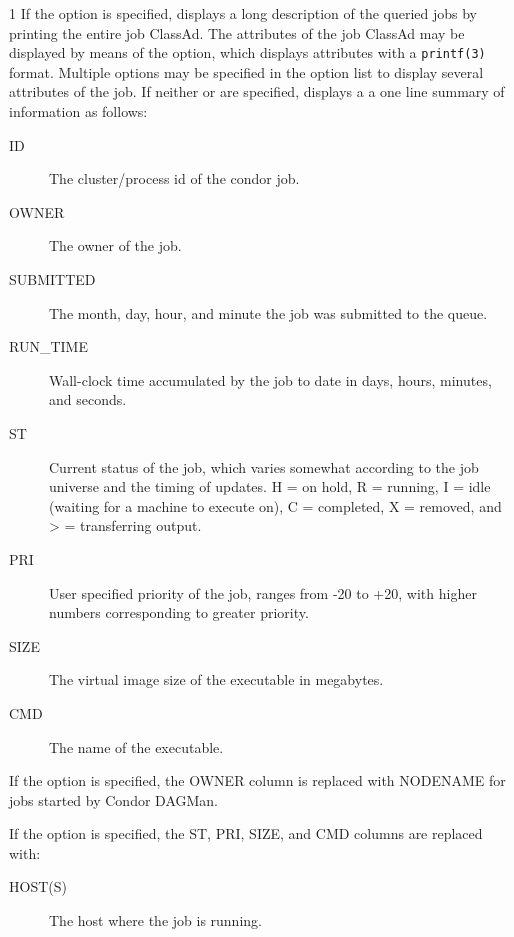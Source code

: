 \begin{ManPage}{\label{man-condor-q}}{1}
If the  option is specified,  displays a long description 
of the queried jobs by printing the entire job ClassAd.
The attributes of the job ClassAd may be displayed by means of the
 option, which displays attributes with a \verb+printf(3)+
format.
Multiple  options may be specified in the option list to display
several attributes of the job.
If neither  or  are specified,  displays a 
a one line summary of information as follows:

\begin{description}
\item[ID] The cluster/process id of the condor job. 
\item[OWNER] The owner of the job. 
\item[SUBMITTED] The month, day, hour, and minute the job was submitted to the 
	queue. 
\item[RUN\_TIME]  Wall-clock time accumulated by the job to date in days, 
	hours, minutes, and seconds.  
\item[ST] Current status of the job, which varies somewhat according
        to the job universe and the timing of updates.
        H = on hold,
        R = running,
	I = idle
        (waiting for a machine to execute on), C = completed, 
        X = removed, and
        > = transferring output. 
\item[PRI] User specified priority of the job, ranges from -20 to +20, with 
	higher numbers corresponding to greater priority. 
\item[SIZE] The virtual image size of the executable in megabytes. 
\item[CMD] The name of the executable. 
\end{description}

If the  option is specified, the OWNER column is replaced
with NODENAME for jobs started by Condor DAGMan.

If the  option is specified, the ST, PRI, SIZE, and CMD
columns are replaced with:

\begin{description}
\item[HOST(S)] The host where the job is running.
\end{description}


\end{ManPage}
